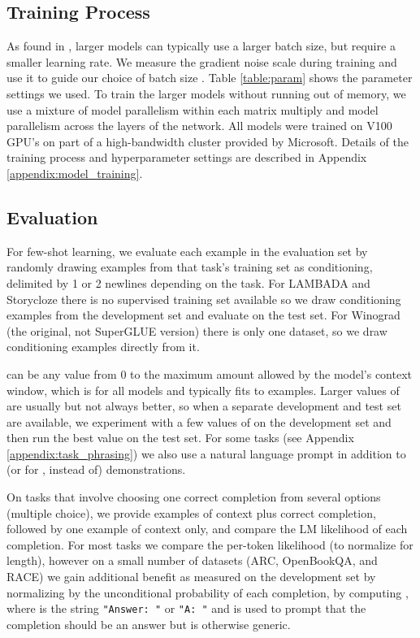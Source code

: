 \documentclass{article}
\begin{document}
    \subsection{Training Process}
    \label{section:Training Process}
    As found in \cite{kaplan2020scaling, mcc2018batchsize}, larger models can typically use a larger batch size, but require a smaller learning rate. We measure the gradient noise scale during training and use it to guide our choice of batch size \cite{mcc2018batchsize}. Table \ref{table:param} shows the parameter settings we used. To train the larger models without running out of memory, we use a mixture of model parallelism within each matrix multiply and model parallelism across the layers of the network.   All models were trained on V100 GPU’s on part of a high-bandwidth cluster provided by Microsoft.  Details of the training process and hyperparameter settings are described in Appendix \ref{appendix:model_training}.

     
    \subsection{Evaluation}
    \label{section:Evaluation}
    For few-shot learning, we evaluate each example in the evaluation set by randomly drawing  examples from that task’s training set as conditioning, delimited by 1 or 2 newlines depending on the task.  For LAMBADA and Storycloze there is no supervised training set available so we draw conditioning examples from the development set and evaluate on the test set.  For Winograd (the original, not SuperGLUE version) there is only one dataset, so we draw conditioning examples directly from it.

 can be any value from 0 to the maximum amount allowed by the model’s context window, which is  for all models and typically fits  to  examples.  Larger values of  are usually but not always better, so when a separate development and test set are available, we experiment with a few values of  on the development set and then run the best value on the test set.  For some tasks (see Appendix \ref{appendix:task_phrasing}) we also use a natural language prompt in addition to (or for , instead of) demonstrations.

On tasks that involve choosing one correct completion from several options (multiple choice), we provide  examples of context plus correct completion, followed by one example of context only, and compare the LM likelihood of each completion.  For most tasks we compare the per-token likelihood (to normalize for length), however on a small number of datasets (ARC, OpenBookQA, and RACE) we gain additional benefit as measured on the development set by normalizing by the unconditional probability of each completion, by computing , where  is the string \texttt{"Answer: "} or \texttt{"A: "} and is used to prompt that the completion should be an answer but is otherwise generic.
\end{document}
